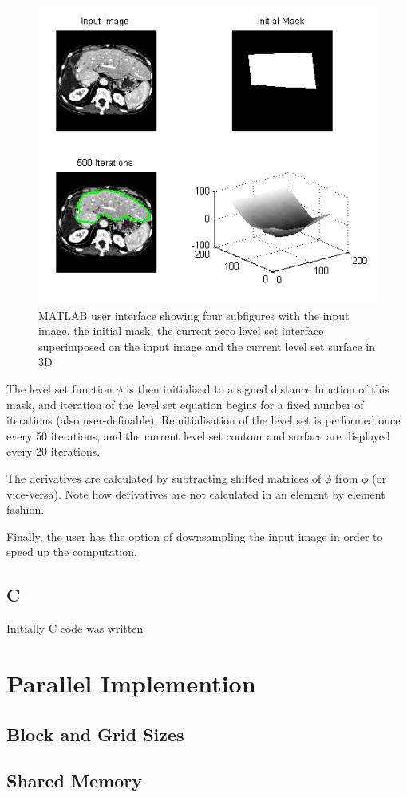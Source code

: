 \begin{figure}[h]
	\centering
		\includegraphics[scale=0.6]{images/matlab.png}
	\caption{MATLAB user interface showing four subfigures with the input image, the initial mask, the current zero level set interface superimposed on the input image and the current level set surface in 3D}
	\label{fig:matlab}
\end{figure}

The level set function $\phi$ is then initialised to a signed distance function of this mask, and iteration of the level set equation begins for a fixed number of iterations (also user-definable). Reinitialisation of the level set is performed once every 50 iterations, and the current level set contour and surface are displayed every 20 iterations.

The derivatives are calculated by subtracting shifted matrices of $\phi$ from $\phi$ (or vice-versa). Note how derivatives are not calculated in an element by element fashion.

Finally, the user has the option of downsampling the input image in order to speed up the computation.



	\subsection{C}
Initially C code was written 


\section{Parallel Implemention}
	\subsection{Block and Grid Sizes}
	\subsection{Shared Memory}